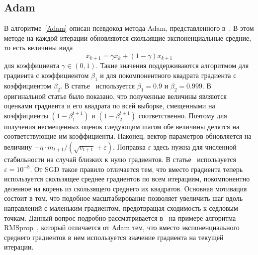 \documentclass[preprint,12pt]{elsarticle}
\begin{document}
{\subsection{Adam}
В алгоритме~\ref{Adam} описан псевдокод метода Adam, представленного в~\cite{adam}. 
В этом методе на каждой итерации обновляются скользящие экспоненциальные средние, то есть величины вида
\[
    \overline{x}_{k+1} = \gamma\overline{x}_k + (1 - \gamma)x_{k+1}
\]
для коэффициента $\gamma \in (0, 1)$. 
Такие значения поддерживаются алгоритмом для градиента с коэффициентом $\beta_1$ и для покомпонентного квадрата градиента с коэффициентом $\beta_2$. 
В статье~\cite{adam} используется $\beta_1 = 0.9$ и $\beta_2 = 0.999$. 
В оригинальной статье было показано, что полученные величины являются оценками градиента и его квадрата по всей выборке, смещенными на коэффициенты $(1 - \beta_1^{t+1})$ и $(1 - \beta_2^{t+1})$ соответственно. 
Поэтому для получения несмещенных оценок следующим шагом обе величины делятся на соответствующие им коэффициенты. 
Наконец, вектор параметров обновляется на величину $-\eta \cdot m_{t+1} / (\sqrt{v_{t+1}} + \varepsilon)$. 
Поправка $\varepsilon$ здесь нужна для численной стабильности на случай близких к нулю градиентов. 
В статье~\cite{adam} используется $\varepsilon = 10^{-8}$.
От SGD такое правило отличается тем, что вместо градиента теперь используется скользящее среднее градиентов по всем итерациям, покомпонентно деленное на корень из скользящего среднего их квадратов. 
Основная мотивация состоит в том, что подобное масштабирование позволяет увеличить шаг вдоль направлений с маленьким градиентом, предотвращая сходимость к седловым точкам. Данный вопрос подробно рассматривается в~\cite{SaddlePoints} на примере алгоритма RMSprop~\cite{RMSprop}, который отличается от Adam тем, что вместо экспоненциального среднего градиентов в нем используется значение градиента на текущей итерации.

}
\end{document}
